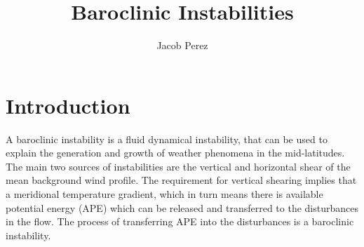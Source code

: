 \documentclass{article}
\title{Baroclinic Instabilities}
\author{Jacob Perez}
\begin{document}
 
\maketitle
\tableofcontents 
\section{Introduction} 

A baroclinic instability is a fluid dynamical instability, that can be used to explain the generation and growth of weather phenomena in the mid-latitudes. The main two sources of instabilities are the vertical and horizontal shear of the mean background wind profile. The requirement for vertical shearing implies that a meridional temperature gradient, which in turn means there is available potential energy (APE) which can be released and transferred to the disturbances in the flow. The process of transferring APE into the disturbances is a baroclinic instability.  
\end{document}
